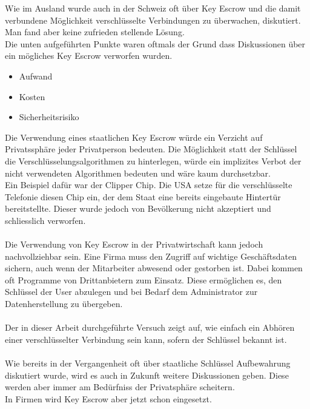Wie im Ausland wurde auch in der Schweiz oft über Key Escrow und die damit verbundene Möglichkeit verschlüsselte Verbindungen zu überwachen, diskutiert. Man fand aber keine zufrieden stellende Lösung.\\
	Die unten aufgeführten Punkte waren oftmals der Grund dass Diskussionen über ein mögliches Key Escrow verworfen wurden.
	\begin{itemize}
		\item Aufwand
		\item Kosten
		\item Sicherheitsrisiko
	\end{itemize}
	
\noindent	Die Verwendung eines staatlichen Key Escrow würde ein Verzicht auf Privatssphäre jeder Privatperson bedeuten. Die Möglichkeit statt der Schlüssel die Verschlüsselungsalgorithmen zu hinterlegen, würde ein implizites Verbot der nicht verwendeten Algorithmen bedeuten und wäre kaum durchsetzbar.\\
	Ein Beispiel dafür war der Clipper Chip. Die USA setze für die verschlüsselte Telefonie diesen Chip ein, der dem Staat eine bereits eingebaute Hintertür bereitstellte. Dieser wurde jedoch von Bevölkerung nicht akzeptiert und schliesslich verworfen.\\
	\\
	Die Verwendung von Key Escrow in der Privatwirtschaft kann jedoch nachvollziehbar sein. Eine Firma muss den Zugriff auf wichtige Geschäftsdaten sichern, auch wenn der Mitarbeiter abwesend oder gestorben ist.
	Dabei kommen oft Programme von Drittanbietern zum Einsatz. Diese ermöglichen es, den Schlüssel der User abzulegen und bei Bedarf dem Administrator zur Datenherstellung zu übergeben.\\
	\\
	Der in dieser Arbeit durchgeführte Versuch zeigt auf, wie einfach ein Abhören einer verschlüsselter Verbindung sein kann, sofern der Schlüssel bekannt ist.\\
	\\
	Wie bereits in der Vergangenheit oft über staatliche Schlüssel Aufbewahrung diskutiert wurde, wird es auch in Zukunft weitere Diskussionen geben. Diese werden aber immer am Bedürfniss der Privatsphäre scheitern.\\
	In Firmen wird Key Escrow aber jetzt schon eingesetzt.